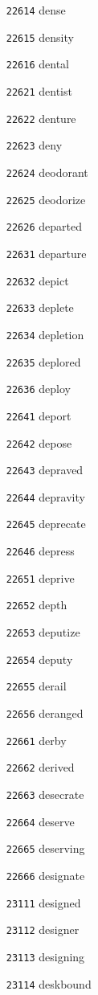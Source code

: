 \documentclass[twoside,11pt]{article}
\begin{document}
\begin{multicols}{5}
\begin{enumerate}
\item[\texttt{22614}] dense
\item[\texttt{22615}] density
\item[\texttt{22616}] dental
\item[\texttt{22621}] dentist
\item[\texttt{22622}] denture
\item[\texttt{22623}] deny
\item[\texttt{22624}] deodorant
\item[\texttt{22625}] deodorize
\item[\texttt{22626}] departed
\item[\texttt{22631}] departure
\item[\texttt{22632}] depict
\item[\texttt{22633}] deplete
\item[\texttt{22634}] depletion
\item[\texttt{22635}] deplored
\item[\texttt{22636}] deploy
\item[\texttt{22641}] deport
\item[\texttt{22642}] depose
\item[\texttt{22643}] depraved
\item[\texttt{22644}] depravity
\item[\texttt{22645}] deprecate
\item[\texttt{22646}] depress
\item[\texttt{22651}] deprive
\item[\texttt{22652}] depth
\item[\texttt{22653}] deputize
\item[\texttt{22654}] deputy
\item[\texttt{22655}] derail
\item[\texttt{22656}] deranged
\item[\texttt{22661}] derby
\item[\texttt{22662}] derived
\item[\texttt{22663}] desecrate
\item[\texttt{22664}] deserve
\item[\texttt{22665}] deserving
\item[\texttt{22666}] designate
\item[\texttt{23111}] designed
\item[\texttt{23112}] designer
\item[\texttt{23113}] designing
\item[\texttt{23114}] deskbound

\end{enumerate}
\end{multicols}
\end{document}
